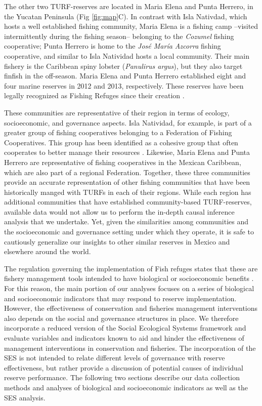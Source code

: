 \documentclass{frontiersSCNS}
\begin{document}
The other two TURF-reserves are located in Maria Elena and Punta
Herrero, in the Yucatan Peninsula (Fig \ref{fig:map}C). In contrast with
Isla Nativdad, which hosts a well established fishing community, Maria
Elena is a fishing camp --visited intermittently during the fishing
season-- belonging to the \emph{Cozumel} fishing cooperative; Punta
Herrero is home to the \emph{José María Azcorra} fishing cooperative,
and similar to Isla Natividad hosts a local community. Their main
fishery is the Caribbean spiny lobster (\emph{Panulirus argus}), but
they also target finfish in the off-season. Maria Elena and Punta
Herrero established eight and four marine reserves in 2012 and 2013,
respectively. These reserves have been legally recognized as Fishing
Refuges since their creation \citep{dof_website_2012,dof_website_2013}.

These communities are representative of their region in terms of
ecology, socioeconomic, and governance aspects. Isla Natividad, for
example, is part of a greater group of fishing cooperatives belonging to
a Federation of Fishing Cooperatives. This group has been identified as
a cohesive group that often cooperates to better manage their resources
\citep{mccay_2014,mccay_2017,acevesbueno_2017}. Likewise, Maria Elena
and Punta Herrero are representative of fishing cooperatives in the
Mexican Caribbean, which are also part of a regional Federation.
Together, these three communities provide an accurate representation of
other fishing communities that have been historically manged with TURFs
in each of their regions. While each region has additional communities
that have established community-based TURF-reserves, available data
would not allow us to perform the in-depth causal inference analysis
that we undertake. Yet, given the similarities among communities and the
socioeconomic and governance setting under which they operate, it is
safe to cautiously generalize our insights to other similar reserves in
Mexico and elsewhere around the world.

The regulation governing the implementation of Fish refuges states that
these are fishery management tools intended to have biological or
socioeconomic benefits \citep{nom}. For this reason, the main portion of
our analyses focuses on a series of biological and socioeconomic
indicators that may respond to reserve implementation. However, the
effectiveness of conservation and fisheries management interventions
also depends on the social and governance structures in place. We
therefore incorporate a reduced version of the Social Ecological Systems
framework \citep{ostrom_2009} and evaluate variables and indicators
known to aid and hinder the effectiveness of management interventions in
conservation and fisheries. The incorporation of the SES is not intended
to relate different levels of governance with reserve effectiveness, but
rather provide a discussion of potential causes of individual reserve
performance. The following two sections describe our data collection
methods and analyses of biological and socioeconomic indicators as well
as the SES analysis.
\end{document}
